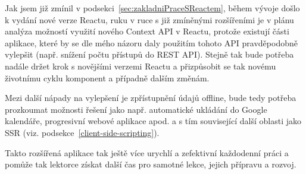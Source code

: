 Jak jsem již zmínil v podsekci~\ref{sec:zakladniPraceSReactem}, během vývoje došlo k vydání nové verze Reactu, ruku v ruce s již zmíněnými rozšířeními je v plánu analýza možností využití nového Context API v Reactu, protože existují části aplikace, které by se dle mého názoru daly použitím tohoto API pravděpodobně vylepšit (např. snížení počtu přístupů do REST API). Stejně tak bude potřeba nadále držet krok s novějšími verzemi Reactu a přizpůsobit se tak novému životnímu cyklu komponent a případně dalším změnám.

Mezi další nápady na vylepšení je zpřístupnění údajů offline, bude tedy potřeba prozkoumat možnosti řešení jako např. automatické ukládání do Google kalendáře, progresivní webové aplikace apod. a s tím související další oblasti jako SSR (viz. podsekce~\ref{client-side-scripting}).

Takto rozšířená aplikace tak ještě více urychlí a zefektivní každodenní práci a pomůže tak lektorce získat další čas pro samotné lekce, jejich přípravu a rozvoj.